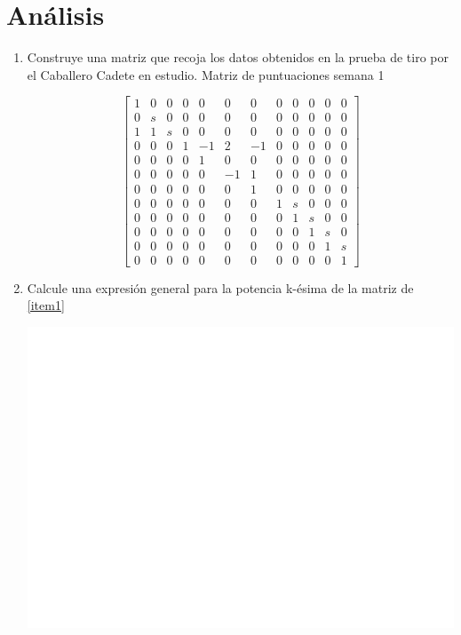 \documentclass[12pt,a4paper]{article}
\begin{document}
\section{Análisis}
\begin{enumerate}
	\item \label{item1} Construye una matriz que recoja los datos obtenidos en la prueba de tiro por el Caballero Cadete en estudio.
		Matriz de puntuaciones semana 1



\setcounter{MaxMatrixCols}{20}
$$\begin{bmatrix}
1& 0& 0& 0&  0&  0&  0& 0& 0& 0& 0& 0\\
0& s& 0& 0&  0&  0&  0& 0& 0& 0& 0& 0\\
1& 1& s& 0&  0&  0&  0& 0& 0& 0& 0& 0\\
0& 0& 0& 1& -1&  2& -1& 0& 0& 0& 0& 0\\
0& 0& 0& 0&  1&  0&  0& 0& 0& 0& 0& 0\\
0& 0& 0& 0&  0& -1&  1& 0& 0& 0& 0& 0\\
0& 0& 0& 0&  0&  0&  1& 0& 0& 0& 0& 0\\
0& 0& 0& 0&  0&  0&  0& 1& s& 0& 0& 0\\
0& 0& 0& 0&  0&  0&  0& 0& 1& s& 0& 0\\
0& 0& 0& 0&  0&  0&  0& 0& 0& 1& s& 0\\
0& 0& 0& 0&  0&  0&  0& 0& 0& 0& 1& s\\
0& 0& 0& 0&  0&  0&  0& 0& 0& 0& 0& 1
\end{bmatrix}$$

	\item Calcule una expresión general para la potencia k-ésima de la matriz de \ref{item1}
	\begin{center}
		\includegraphics[page=2, trim= 4cm 2cm 1cm 4cm ,clip,scale=0.65]{MatrixSimb.pdf}
	\end{center}


\end{enumerate}
\end{document}
